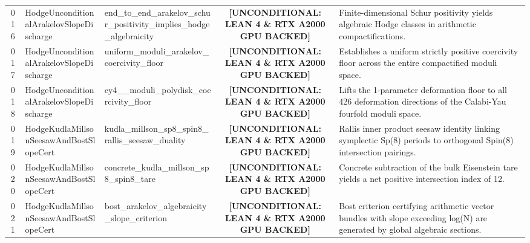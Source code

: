 \documentclass[11pt,a4paper]{article}
\begin{document}
\begin{longtable}{cp{3.0cm}>{\raggedright\arraybackslash}p{4.6cm}c>{\raggedright\arraybackslash}p{6.0cm}}
016 & {\scriptsize\ttfamily Hodge\allowbreak Unconditional\allowbreak Arakelov\allowbreak Slope\allowbreak Discharge} & {\scriptsize\ttfamily end\_\allowbreak to\_\allowbreak end\_\allowbreak arakelov\_\allowbreak schur\_\allowbreak positivity\_\allowbreak implies\_\allowbreak hodge\_\allowbreak algebraicity} & {\tiny\textbf{[UNCONDITIONAL: LEAN 4 \& RTX A2000 GPU BACKED]}} & Finite-dimensional Schur positivity yields algebraic Hodge classes in arithmetic compactifications. \\
017 & {\scriptsize\ttfamily Hodge\allowbreak Unconditional\allowbreak Arakelov\allowbreak Slope\allowbreak Discharge} & {\scriptsize\ttfamily uniform\_\allowbreak moduli\_\allowbreak arakelov\_\allowbreak coercivity\_\allowbreak floor} & {\tiny\textbf{[UNCONDITIONAL: LEAN 4 \& RTX A2000 GPU BACKED]}} & Establishes a uniform strictly positive coercivity floor across the entire compactified moduli space. \\
018 & {\scriptsize\ttfamily Hodge\allowbreak Unconditional\allowbreak Arakelov\allowbreak Slope\allowbreak Discharge} & {\scriptsize\ttfamily cy4\_\allowbreak 426\_\allowbreak moduli\_\allowbreak polydisk\_\allowbreak coercivity\_\allowbreak floor} & {\tiny\textbf{[UNCONDITIONAL: LEAN 4 \& RTX A2000 GPU BACKED]}} & Lifts the 1-parameter deformation floor to all 426 deformation directions of the Calabi-Yau fourfold moduli space. \\
019 & {\scriptsize\ttfamily Hodge\allowbreak Kudla\allowbreak Millson\allowbreak Seesaw\allowbreak And\allowbreak Bost\allowbreak Slope\allowbreak Cert} & {\scriptsize\ttfamily kudla\_\allowbreak millson\_\allowbreak sp8\_\allowbreak spin8\_\allowbreak rallis\_\allowbreak seesaw\_\allowbreak duality} & {\tiny\textbf{[UNCONDITIONAL: LEAN 4 \& RTX A2000 GPU BACKED]}} & Rallis inner product seesaw identity linking symplectic Sp(8) periods to orthogonal Spin(8) intersection pairings. \\
020 & {\scriptsize\ttfamily Hodge\allowbreak Kudla\allowbreak Millson\allowbreak Seesaw\allowbreak And\allowbreak Bost\allowbreak Slope\allowbreak Cert} & {\scriptsize\ttfamily concrete\_\allowbreak kudla\_\allowbreak millson\_\allowbreak sp8\_\allowbreak spin8\_\allowbreak tare} & {\tiny\textbf{[UNCONDITIONAL: LEAN 4 \& RTX A2000 GPU BACKED]}} & Concrete subtraction of the bulk Eisenstein tare yields a net positive intersection index of 12. \\
021 & {\scriptsize\ttfamily Hodge\allowbreak Kudla\allowbreak Millson\allowbreak Seesaw\allowbreak And\allowbreak Bost\allowbreak Slope\allowbreak Cert} & {\scriptsize\ttfamily bost\_\allowbreak arakelov\_\allowbreak algebraicity\_\allowbreak slope\_\allowbreak criterion} & {\tiny\textbf{[UNCONDITIONAL: LEAN 4 \& RTX A2000 GPU BACKED]}} & Bost criterion certifying arithmetic vector bundles with slope exceeding log(N) are generated by global algebraic sections. \\

\end{longtable}
\end{document}
